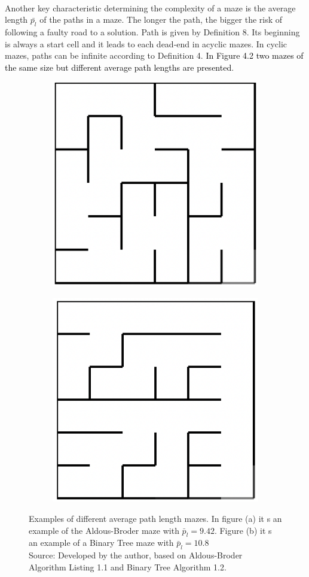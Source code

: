 \newline
\newline
\\
Another key characteristic determining the complexity of a maze is the average length $\bar{p_l}$ of the paths in a maze. The longer the path, the bigger
the risk of following a faulty road to a solution. Path is given by Definition 8. Its beginning is always a start cell and it leads to
each dead-end in acyclic mazes. In cyclic mazes, paths can be infinite according to Definition 4. \textcolor{black}{In Figure 4.2 two mazes of the same size
but different average path lengths are presented}.
\newline
\begin{figure}[!h]
\centering
\begin{subfigure}{.5\textwidth}
\centering
\includegraphics[width=.5\linewidth]{aldous}
\caption{}
\label{fig:sub1}
\end{subfigure}%
\begin{subfigure}{.5\textwidth}
\centering
\includegraphics[width=.5\linewidth]{binary}
\caption{}
\label{fig:sub2}
\end{subfigure}
\caption{Examples of different average path length mazes. In figure (a) it s an example of the Aldous-Broder maze with $\bar{p}_l = 9.42$. Figure (b) it s an example of a Binary Tree maze with $\bar{p}_l = 10.8$\\ Source: Developed by the author,  based on Aldous-Broder Algorithm Listing 1.1 and Binary Tree Algorithm 1.2. }
\label{fig:test}
\end{figure}
